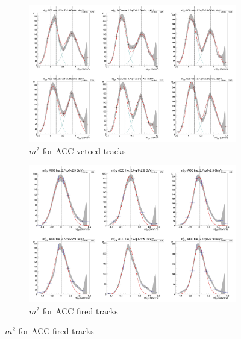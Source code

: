 \begin{figure}[H]
  \ContinuedFloat
    \begin{subfigure}{1\textwidth}
    \includegraphics[width=1\textwidth]{hiptfits/pos/PSm2_cent0_ich1_accfire0_ptbin11.jpg}
    \caption{$m^2$ for ACC vetoed tracks}
    \end{subfigure}
    \begin{subfigure}{1\textwidth}
    \includegraphics[width=1\textwidth]{hiptfits/pos/PSm2_cent0_ich1_accfire1_ptbin11.jpg}
    \caption{$m^2$ for ACC fired tracks}
    \end{subfigure}  
\end{figure}
